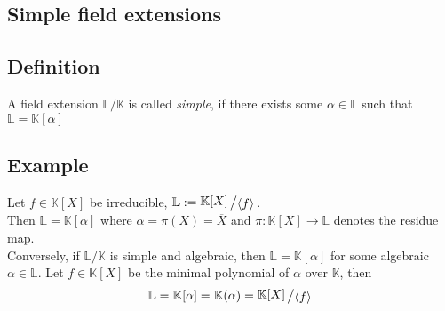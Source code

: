 \documentclass[12pt]{book}
\newcommand{\slant}[2]{{\raisebox{.1em}{$#1$}\left/\raisebox{-.1em}{$#2$}\right.}}
\begin{document}
\begin{spacing}{1.3}

\renewcommand*\thesection{§ \arabic{section}\quad}
\section{Simple field extensions}
\renewcommand*\thesection{\arabic{section}}

\subsection{Definition} %
A field extension $\mathbb{L}/\mathbb{K}$ is called \textit{simple}, if there exists some $\alpha \in \mathbb{L}$ such that $\mathbb{L}=\mathbb{K}[\alpha]$

\subsection*{Example} %
\titleformat{\subsection}{\normalfont\normalsize\bfseries}{}{0em}{#1 \thesubsection}
Let $f \in \mathbb{K}[X]$ be irreducible, $\mathbb{L}:=\slant{\mathbb{K}[X]}{\langle f\rangle}$.\\
Then $\mathbb{L}=\mathbb{K}[\alpha]$ where $\alpha= \pi(X)=\overline{X}$ and $\pi: \mathbb{K}[X] \longrightarrow \mathbb{L}$ denotes the residue map.\\
Conversely, if $\mathbb{L}/\mathbb{K}$ is simple and algebraic, then $\mathbb{L}=\mathbb{K}[\alpha]$ for some algebraic $\alpha \in \mathbb{L}$. Let $f \in  \mathbb{K}[X]$ be the minimal polynomial of $\alpha$ over $\mathbb{K}$, then $$\mathbb{L}=\mathbb{K}[\alpha]=\mathbb{K}(\alpha)=\slant{\mathbb{K}[X]}{\langle f \rangle}$$


\end{spacing}
\end{document}
